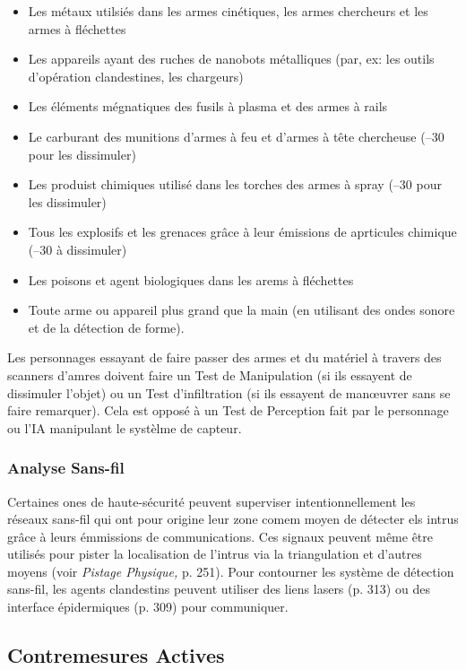 \begin{itemize} \item Les métaux utilsiés dans les armes cinétiques, les armes chercheurs et les armes à fléchettes \item Les appareils ayant des ruches de nanobots métalliques (par, ex: les outils d'opération clandestines, les chargeurs) \item Les éléments mégnatiques des fusils à plasma et des armes à rails \item Le carburant des munitions d'armes à feu et d'armes à tête chercheuse (–30 pour les dissimuler) \item Les produist chimiques utilisé dans les torches des armes à spray (–30 pour les dissimuler) \item Tous les explosifs et les grenaces grâce à leur émissions de aprticules chimique (–30 à dissimuler) \item Les poisons et agent biologiques dans les arems à fléchettes \item Toute arme ou appareil plus grand que la main (en utilisant des ondes sonore et de la détection de forme). \end{itemize} 

Les personnages essayant de faire passer des armes et du matériel à travers des scanners d'amres doivent faire un Test de Manipulation (si ils essayent de dissimuler l'objet) ou un Test d'infiltration (si ils essayent de manœuvrer sans se faire remarquer). Cela est opposé à un Test de Perception fait par le personnage ou l'IA manipulant le systèlme de capteur. 

\subsubsection{Analyse Sans-fil} 

Certaines ones de haute-sécurité peuvent superviser intentionnellement les réseaux sans-fil qui ont pour origine leur zone comem moyen de détecter els intrus grâce à leurs émmissions de communications. Ces signaux peuvent même être utilisés pour pister la localisation de l'intrus via la triangulation et d'autres moyens (voir \textit{Pistage Physique,} p. 251). Pour contourner les système de détection sans-fil, les agents clandestins peuvent utiliser des liens lasers (p. 313) ou des interface épidermiques (p. 309) pour communiquer. 

\subsection{Contremesures Actives} 

